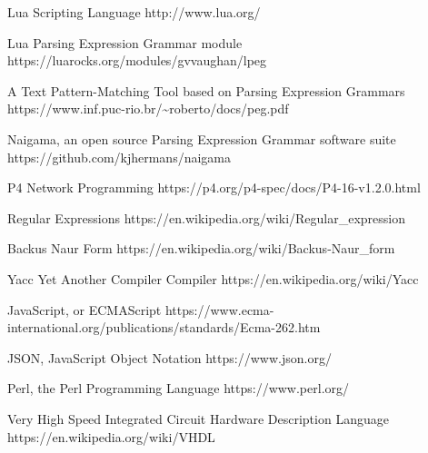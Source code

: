 \begin{thebibliography}{12}

  Lua Scripting Language
  http://www.lua.org/

  Lua Parsing Expression Grammar module
  https://luarocks.org/modules/gvvaughan/lpeg

  A Text Pattern-Matching Tool based on Parsing Expression Grammars
  https://www.inf.puc-rio.br/\~{}roberto/docs/peg.pdf

  Naigama, an open source Parsing Expression Grammar software suite
  https://github.com/kjhermans/naigama

  P4 Network Programming
  https://p4.org/p4-spec/docs/P4-16-v1.2.0.html

  Regular Expressions
  https://en.wikipedia.org/wiki/Regular\_expression

  Backus Naur Form
  https://en.wikipedia.org/wiki/Backus-Naur\_form

  Yacc Yet Another Compiler Compiler
  https://en.wikipedia.org/wiki/Yacc

  JavaScript, or ECMAScript
  https://www.ecma-international.org/publications/standards/Ecma-262.htm

  JSON, JavaScript Object Notation
  https://www.json.org/

  Perl, the Perl Programming Language
  https://www.perl.org/

  Very High Speed Integrated Circuit Hardware Description Language
  https://en.wikipedia.org/wiki/VHDL

\end{thebibliography}
